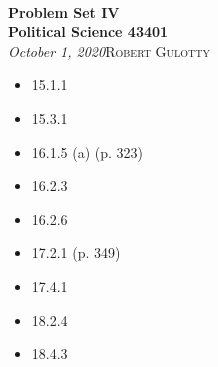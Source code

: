 \documentclass[12pt]{article}
\begin{document}
{\noindent\Huge\bf  \\[0.5\baselineskip] {\selectfont  Problem Set IV}         }\\[2\baselineskip] %
{ {\bf {}\selectfont Political Science 43401}\\ {\textit{\selectfont     October 1, 2020}}}\hfill   {\large \textsc{Robert Gulotty}} %
\\[1.4\baselineskip] 





\begin{itemize}
\item 15.1.1
\item 15.3.1
\item  16.1.5 (a) (p. 323)
\item 16.2.3
\item 16.2.6
\item  17.2.1 (p. 349)
\item 17.4.1
\item 18.2.4
\item 18.4.3
\end{itemize}
\end{document}
